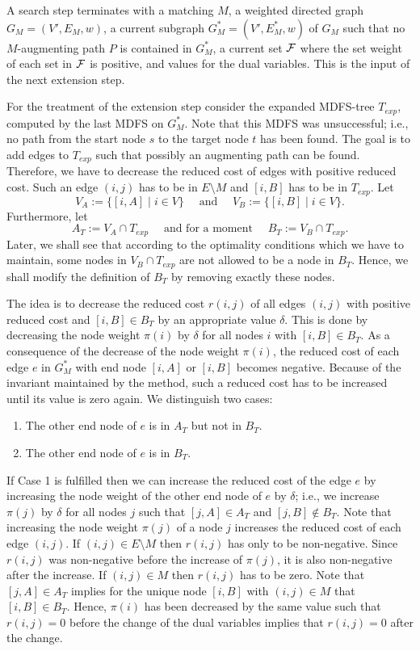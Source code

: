 \documentclass[12pt,twoside,a4paper]{article}
\begin{document}
A search step terminates with a matching $M$, a weighted directed graph
$G_M = (V',E_M,w)$, a current subgraph $G^*_M = (V',E^*_M,w)$ of $G_M$ such that
no $M$-augmenting path $P$ is contained in $G^*_M$, a current set $\cal F$ where
the set weight of each set in $\cal F$ is positive, and values 
for the dual variables. This is the input of the next extension step.

For the treatment of the extension step consider the expanded MDFS-tree 
$T_{exp}$, computed by the last MDFS on $G^*_M$. Note that this MDFS was 
unsuccessful; i.e., no path from the start node $s$ to the target node $t$ has been 
found. The goal is to add edges to $T_{exp}$ such that 
possibly an augmenting path can be found. Therefore, we have to decrease the 
reduced cost of edges with positive reduced cost. Such an edge $(i,j)$ has to 
be in $E \setminus M$ and $[i,B]$ has to be in $T_{exp}$. Let
$$V_A := \{[i,A] \mid i \in V\} \quad \mbox{ and } \quad 
V_B := \{[i,B] \mid i \in V\}.$$
Furthermore, let
$$A_T := V_A \cap T_{exp} \quad \mbox{ and for a moment } \quad 
B_T := V_B \cap T_{exp}.$$
Later, we shall see that according to the optimality
conditions which we have to maintain, some nodes in $V_B \cap T_{exp}$ are
not allowed to be a node in $B_T$. Hence, we shall modify the definition of
$B_T$ by removing exactly these nodes.

The idea is to decrease the reduced cost $r(i,j)$ of all edges $(i,j)$ with 
positive reduced cost and $[i,B] \in B_T$ by an appropriate value $\delta$.
This is done by decreasing the node weight $\pi(i)$ by $\delta$ for all nodes 
$i$ with $[i,B] \in B_T$.
As a consequence of the decrease of the node weight $\pi(i)$, the reduced cost
of each edge $e$ in $G_M^*$ with end node $[i,A]$ or $[i,B]$ becomes negative. 
Because of the invariant maintained by the method, such a reduced cost has to be increased 
until its value is zero again. We distinguish two cases:
\begin{enumerate}
\item
The other end node of $e$ is in $A_T$ but not in $B_T$.
\item
The other end node of $e$ is in $B_T$.
\end{enumerate}
If Case 1 is fulfilled then we can increase the reduced cost of the edge $e$ by 
increasing the node weight of the other end node of $e$ by $\delta$; i.e.,
we increase $\pi(j)$ by $\delta$ for all nodes $j$ such that $[j,A] \in A_T$
and $[j,B] \not\in B_T$.
Note that increasing the node weight $\pi(j)$ of a node $j$ increases the reduced 
cost of each edge $(i,j)$.
If $(i,j) \in E \setminus M$ then $r(i,j)$ has only to be non-negative. Since
$r(i,j)$ was non-negative before the increase of $\pi(j)$, it is also non-negative after 
the increase. If $(i,j) \in M$ then $r(i,j)$ has to be zero. Note that $[j,A] \in A_T$
implies for the unique node $[i,B]$ with $(i,j) \in M$ that $[i,B] \in B_T$.
Hence, $\pi(i)$ has been decreased by the same value such that $r(i,j) = 0$ 
before the change of the dual variables implies that $r(i,j) = 0$ after the
change.
\end{document}

